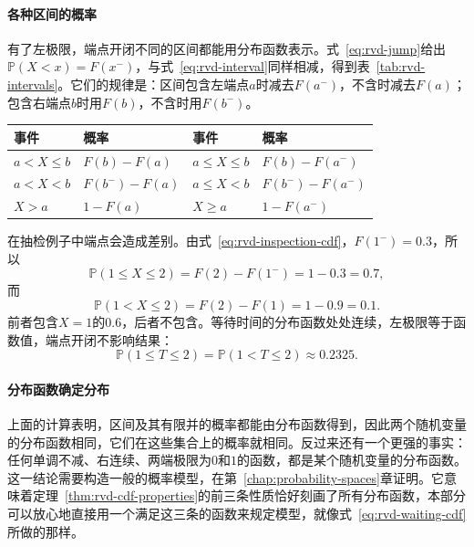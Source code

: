\paragraph{各种区间的概率}
有了左极限，端点开闭不同的区间都能用分布函数表示。式~\eqref{eq:rvd-jump}给出$\mathbb{P}(X<x)=F(x^{-})$，与式~\eqref{eq:rvd-interval}同样相减，得到表~\ref{tab:rvd-intervals}。它们的规律是：区间包含左端点$a$时减去$F(a^{-})$，不含时减去$F(a)$；包含右端点$b$时用$F(b)$，不含时用$F(b^{-})$。

\begin{BookInlineTable}
  \centering
  \begin{tabular}{ll@{\qquad}ll}
    \toprule
    事件 & 概率 & 事件 & 概率\\
    \midrule
    $a<X\leq b$ & $F(b)-F(a)$ & $a\leq X\leq b$ & $F(b)-F(a^{-})$\\
    $a<X<b$ & $F(b^{-})-F(a)$ & $a\leq X<b$ & $F(b^{-})-F(a^{-})$\\
    $X>a$ & $1-F(a)$ & $X\geq a$ & $1-F(a^{-})$\\
    \bottomrule
  \end{tabular}
  \caption{用分布函数表示区间概率，其中$a<b$，$F=F_X$，$F(a^{-})$是左极限。$F$在$a$、$b$处连续时，左右两列相同。}
  \label{tab:rvd-intervals}
\end{BookInlineTable}

在抽检例子中端点会造成差别。由式~\eqref{eq:rvd-inspection-cdf}，$F(1^{-})=0.3$，所以
\[
  \mathbb{P}(1\leq X\leq2)=F(2)-F(1^{-})=1-0.3=0.7,
\]
而
\[
  \mathbb{P}(1<X\leq2)=F(2)-F(1)=1-0.9=0.1 .
\]
前者包含$X=1$的$0.6$，后者不包含。等待时间的分布函数处处连续，左极限等于函数值，端点开闭不影响结果：
\[
  \mathbb{P}(1\leq T\leq2)=\mathbb{P}(1<T\leq2)\approx0.2325 .
\]

\paragraph{分布函数确定分布}
上面的计算表明，区间及其有限并的概率都能由分布函数得到，因此两个随机变量的分布函数相同，它们在这些集合上的概率就相同。反过来还有一个更强的事实：任何单调不减、右连续、两端极限为$0$和$1$的函数，都是某个随机变量的分布函数。这一结论需要构造一般的概率模型，在第~\ref{chap:probability-spaces}章证明。它意味着定理~\ref{thm:rvd-cdf-properties}的前三条性质恰好刻画了所有分布函数，本部分可以放心地直接用一个满足这三条的函数来规定模型，就像式~\eqref{eq:rvd-waiting-cdf}所做的那样。
